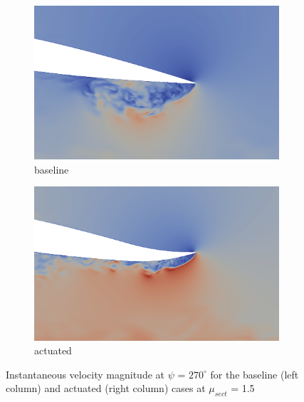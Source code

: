 \begin{figure}[H]
	\centering
	
	\begin{subfigure}[b]{0.4\textwidth}
		\centering
		\includegraphics[width=1\textwidth]{figures/mu_1pt5/baseline/ph_270_velocity_zoomed_airfoil_0_to_1pt5.png}
		\caption{ baseline}
		\label{fig:mu_1pt5_baseline_zoomed_velocity}
	\end{subfigure}
	\begin{subfigure}[b]{0.4\textwidth}
		\centering
		\includegraphics[width=1\textwidth]{figures/mu_1pt5/AC/ph_270_velocity_zoomed_airfoil_0_to_1pt5.png}
		\caption{actuated}
		\label{fig:mu_1pt5_AC_zoomed_velocity}
	\end{subfigure}
	\caption{Instantaneous velocity magnitude at $\psi$ = $270^\circ$ for the baseline (left column) and actuated (right column) cases at $\mu_{sect}$ = 1.5}
	\label{fig:mu_1pt5_zoomed_velocity}
\end{figure}

